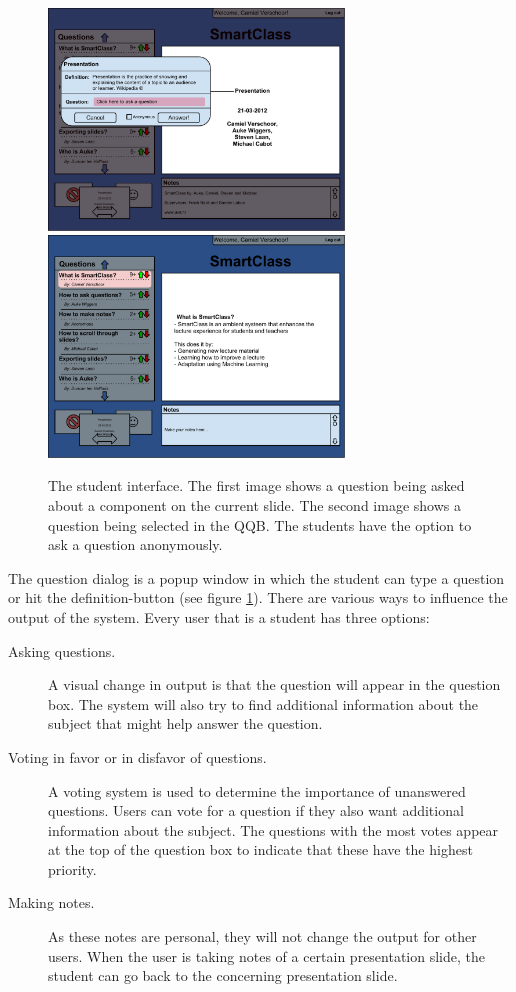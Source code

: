 \documentclass[11pt]{article}
\begin{document}
\begin{figure}[!h]
\centering
\includegraphics[width=0.7\textwidth]{studentInterfaceDialog.pdf}
\includegraphics[width=0.7\textwidth]{studentInterfaceAnswer.pdf}
\caption{The student interface. The first image shows a question being asked about a component on the current slide. The second image shows a question being selected in the QQB. The students have the option to ask a question anonymously.}
\label{studentInterfaceDialogAnswer}
\end{figure}

The question dialog is a popup window in which the student can type a question or hit the definition-button (see figure \ref{studentInterfaceDialogAnswer}). There are various ways to influence the output of the system. Every user that is a student has three options:
\begin{description}
\item[Asking questions.] A visual change in output is that the question will appear in the question box. The system will also try to find additional information about the subject that might help answer the question.
\item[Voting in favor or in disfavor of questions.] A voting system is used to determine the importance of unanswered questions. Users can vote for a question if they also want additional information about the subject. The questions with the most votes appear at the top of the question box to indicate that these have the highest priority.
\item[Making notes.] As these notes are personal, they will not change the output for other users. When the user is taking notes of a certain presentation slide, the student can go back to the concerning presentation slide.
\end{description}
\end{document}
